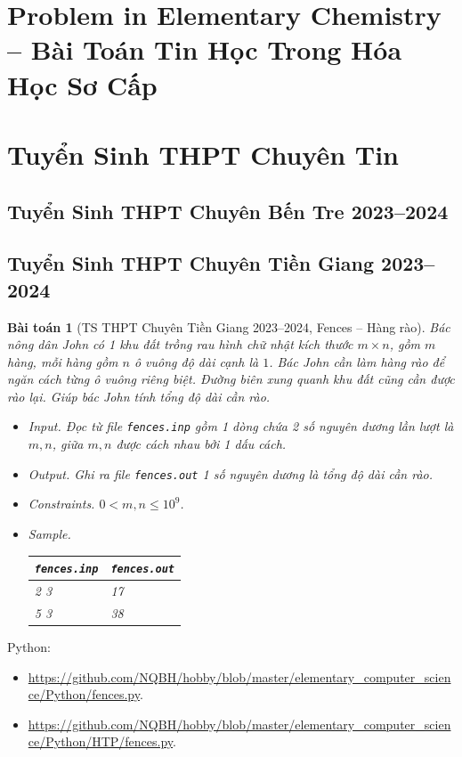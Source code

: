\documentclass{article}
\newtheorem{baitoan}{Bài toán}
\begin{document}

\section{Problem in Elementary Chemistry -- Bài Toán Tin Học Trong Hóa Học Sơ Cấp}


\section{Tuyển Sinh THPT Chuyên Tin}

\subsection{Tuyển Sinh THPT Chuyên Bến Tre 2023--2024}

\subsection{Tuyển Sinh THPT Chuyên Tiền Giang 2023--2024}

\begin{baitoan}[TS THPT Chuyên Tiền Giang 2023--2024, Fences -- Hàng rào]
	Bác nông dân John có 1 khu đất trồng rau hình chữ nhật kích thước $m\times n$, gồm $m$ hàng, mỗi hàng gồm $n$ ô vuông độ dài cạnh là $1$. Bác John cần làm hàng rào để ngăn cách từng ô vuông riêng biệt. Đường biên xung quanh  khu đất cũng cần được rào lại. Giúp bác John tính tổng độ dài cần rào.
	\begin{itemize}
		\item {\sf Input.} Đọc từ file \verb|fences.inp| gồm 1 dòng chứa 2 số nguyên dương lần lượt là $m,n$, giữa $m,n$ được cách nhau bởi 1 dấu cách.
		\item {\sf Output.} Ghi ra file \verb|fences.out| 1 số nguyên dương là tổng độ dài cần rào.
		\item {\sf Constraints.} $0 < m,n\le10^9$.
		\item {\sf Sample.}
		\begin{table}[H]
			\centering
			\begin{tabular}{|l|l|}
				\hline
				{\tt fences.inp} & {\tt fences.out} \\
				\hline
				2 3 & 17 \\
				\hline
				5 3 & 38 \\
				\hline
			\end{tabular}
		\end{table}
	\end{itemize}
\end{baitoan}
Python:
\begin{itemize}
	\item \url{https://github.com/NQBH/hobby/blob/master/elementary_computer_science/Python/fences.py}.
	\item \url{https://github.com/NQBH/hobby/blob/master/elementary_computer_science/Python/HTP/fences.py}.
\end{itemize}
\end{document}
